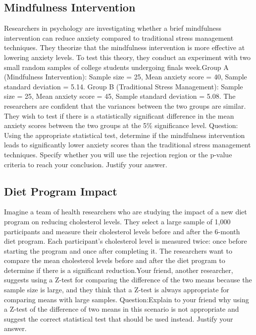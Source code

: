 \documentclass{article}
\begin{document}
\subsection*{Mindfulness Intervention}
Researchers in psychology are investigating whether a brief mindfulness intervention can reduce anxiety compared to traditional stress management techniques. They theorize that the mindfulness intervention is more effective at lowering anxiety levels. To test this theory, they conduct an experiment with two small random samples of college students undergoing finals week.Group A (Mindfulness Intervention): Sample size = 25, Mean anxiety score = 40, Sample standard deviation = 5.14. Group B (Traditional Stress Management): Sample size = 25, Mean anxiety score = 45, Sample standard deviation = 5.08. The researchers are confident that the variances between the two groups are similar. They wish to test if there is a statistically significant difference in the mean anxiety scores between the two groups at the 5\% significance level.
Question: Using the appropriate statistical test, determine if the mindfulness intervention leads to significantly lower anxiety scores than the traditional stress management techniques. Specify whether you will use the rejection region or the p-value criteria to reach your conclusion.
Justify your answer.


\subsection*{Diet Program Impact}
Imagine a team of health researchers who are studying the impact of a new diet program on reducing cholesterol levels. They select a large sample of 1,000 participants and measure their cholesterol levels before and after the 6-month diet program. Each participant’s cholesterol level is measured twice: once before starting the program and once after completing it. The researchers want to compare the mean cholesterol levels before and after the diet program to determine if there is a significant reduction.Your friend, another researcher, suggests using a Z-test for comparing the difference of the two means because the sample size is large, and they think that a Z-test is always appropriate for comparing means with large samples.
Question:Explain to your friend why using a Z-test of the difference of two means in this scenario is not appropriate and suggest the correct statistical test that should be used instead.
Justify your answer.
\end{document}
